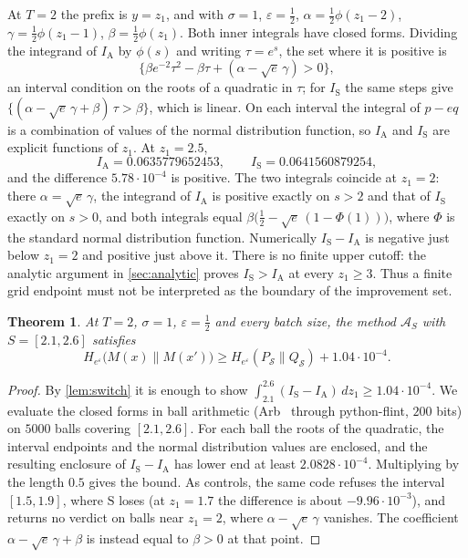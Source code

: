 \documentclass[11pt]{amsart}
\newtheorem{theorem}{Theorem}[section]
\theoremstyle{definition}
\theoremstyle{remark}
\newcommand{\ANTI}{\mathrm{A}}
\newcommand{\SAME}{\mathrm{S}}
\newcommand{\He}{H_{e^{\varepsilon}}}
\begin{document}
At $T=2$ the prefix is $y=z_1$, and with $\sigma=1$, $\varepsilon=\frac12$, $\alpha=\frac12\phi(z_1-2)$, $\gamma=\frac12\phi(z_1-1)$, $\beta=\frac12\phi(z_1)$. Both inner integrals have closed forms. Dividing the integrand of $I_{\ANTI}$ by $\phi(s)$ and writing $\tau=e^{s}$, the set where it is positive is
\[
\{\beta e^{-2}\tau^2-\beta\tau+(\alpha-\sqrt e\,\gamma)>0\},
\]
an interval condition on the roots of a quadratic in $\tau$; for $I_{\SAME}$ the same steps give $\{(\alpha-\sqrt e\,\gamma+\beta)\,\tau>\beta\}$, which is linear. On each interval the integral of $p-e q$ is a combination of values of the normal distribution function, so $I_{\ANTI}$ and $I_{\SAME}$ are explicit functions of $z_1$. At $z_1=2.5$,
\[
I_{\ANTI}=0.0635779652453,\qquad I_{\SAME}=0.0641560879254,
\]
and the difference $5.78\cdot10^{-4}$ is positive. The two integrals coincide at $z_1=2$: there $\alpha=\sqrt e\,\gamma$, the integrand of $I_{\ANTI}$ is positive exactly on $s>2$ and that of $I_{\SAME}$ exactly on $s>0$, and both integrals equal $\beta\bigl(\frac12-\sqrt e\,(1-\Phi(1))\bigr)$, where $\Phi$ is the standard normal distribution function. Numerically $I_{\SAME}-I_{\ANTI}$ is negative just below $z_1=2$ and positive just above it. There is no finite upper cutoff: the analytic argument in \cref{sec:analytic} proves $I_{\SAME}>I_{\ANTI}$ at every $z_1\ge3$. Thus a finite grid endpoint must not be interpreted as the boundary of the improvement set.

\begin{theorem}\label{thm:T2}
At $T=2$, $\sigma=1$, $\varepsilon=\frac12$ and every batch size, the method $\mathcal A_S$ with $S=[2.1,2.6]$ satisfies
\[
\He\bigl(M(x)\|M(x')\bigr)\ge\He(P_{\mathcal S}\|Q_{\mathcal S})+1.04\cdot10^{-4}.
\]
\end{theorem}

\begin{proof}
By \cref{lem:switch} it is enough to show $\int_{2.1}^{2.6}(I_{\SAME}-I_{\ANTI})\,dz_1\ge1.04\cdot10^{-4}$. We evaluate the closed forms in ball arithmetic (Arb~\cite{Joh17} through python-flint, $200$ bits) on $5000$ balls covering $[2.1,2.6]$. For each ball the roots of the quadratic, the interval endpoints and the normal distribution values are enclosed, and the resulting enclosure of $I_{\SAME}-I_{\ANTI}$ has lower end at least $2.0828\cdot10^{-4}$. Multiplying by the length $0.5$ gives the bound. As controls, the same code refuses the interval $[1.5,1.9]$, where $\SAME$ loses (at $z_1=1.7$ the difference is about $-9.96\cdot10^{-3}$), and returns no verdict on balls near $z_1=2$, where $\alpha-\sqrt e\,\gamma$ vanishes. The coefficient $\alpha-\sqrt e\,\gamma+\beta$ is instead equal to $\beta>0$ at that point.
\end{proof}
\end{document}
